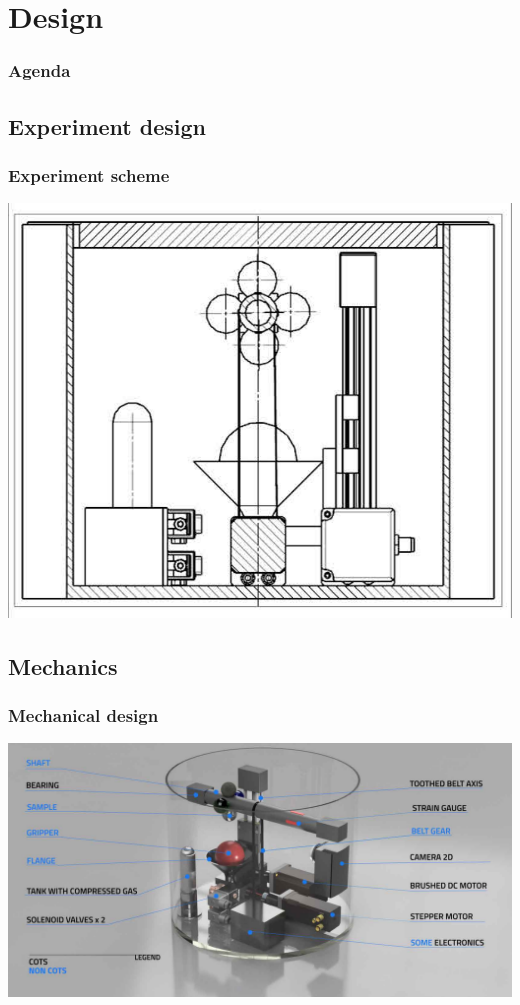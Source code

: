 \documentclass[xcolor=dvipsnames]{beamer}%
\begin{document}
\section{Design}

\begin{frame}
\frametitle{Agenda}
\tableofcontents[currentsection]
\end{frame}

\subsection{Experiment design}
\begin{frame}
\frametitle{Experiment scheme}
  \centering
  \includegraphics[height=0.9\textheight]{figure/rys_schemat.pdf}	
\end{frame}



\subsection{Mechanics}
\begin{frame}
\frametitle{Mechanical design}
  \centering
  \includegraphics[width=\linewidth]{figure/Modul_v3.pdf}
\end{frame}
\end{document}
